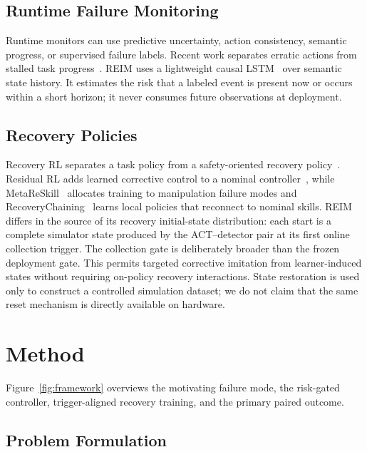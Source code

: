 \documentclass[conference]{IEEEtran}
\begin{document}
\subsection{Runtime Failure Monitoring}

Runtime monitors can use predictive uncertainty, action consistency, semantic
progress, or supervised failure labels. Recent work separates erratic actions
from stalled task progress~\cite{agia2025sentinel}. REIM uses a lightweight
causal LSTM~\cite{hochreiter1997lstm} over semantic state history. It estimates
the risk that a labeled event is present now or occurs within a short horizon;
it never consumes future observations at deployment.

\subsection{Recovery Policies}

Recovery RL separates a task policy from a safety-oriented recovery
policy~\cite{thananjeyan2021recovery}. Residual RL adds learned corrective
control to a nominal controller~\cite{johannink2019residual}, while
MetaReSkill~\cite{vats2023metareskill} allocates training to manipulation
failure modes and RecoveryChaining~\cite{vats2024recoverychaining} learns local
policies that reconnect to nominal skills. REIM differs in the source of its
recovery initial-state distribution: each start is a complete simulator state
produced by the ACT--detector pair at its first online collection trigger. The
collection gate is deliberately broader than the frozen deployment gate. This
permits targeted corrective imitation from learner-induced states without
requiring on-policy recovery interactions. State restoration is used only to
construct a controlled simulation dataset; we do not claim that the same reset
mechanism is directly available on hardware.

\section{Method}
\label{sec:method}

Figure~\ref{fig:framework} overviews the motivating failure mode, the
risk-gated controller, trigger-aligned recovery training, and the primary
paired outcome.

\subsection{Problem Formulation}
\end{document}
